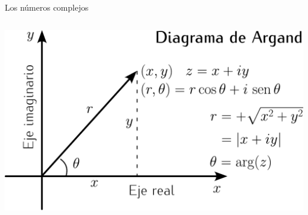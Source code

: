 \documentclass[9pt, aspectratio=169]{beamer}
\begin{document}
\begin{frame}{Los números complejos}
\begin{columns}[t]
  \begin{center}
    \includegraphics[width=1.0\textwidth]{figs/argand.pdf} 
  \end{center}
\end{columns}
\end{frame}
\end{document}
